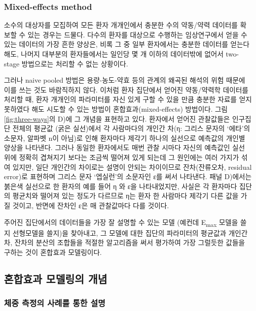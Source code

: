\documentclass[
  10pt,
  krantz2,
  a4paper]{krantz}
\theoremstyle{definition}
\theoremstyle{definition}
\theoremstyle{definition}
\theoremstyle{remark}
\begin{document}
\hypertarget{mixed-effects-method}{%
\subsubsection{Mixed-effects method}\label{mixed-effects-method}}

소수의 대상자를 모집하여 모든 환자 개개인에서 충분한 수의 약동/약력 데이터를 확보할 수 있는 경우는 드물다. 다수의 환자를 대상으로 수행하는 임상연구에서 얻을 수 있는 데이터의 가장 흔한 양상은, 비록 그 중 일부 환자에서는 충분한 데이터를 얻는다 해도, 나머지 대부분의 환자들에서는 일인당 몇 개 이하의 데이터밖에 없어서 two-stage 방법으로는 처리할 수 없는 상황이다.

그러나 naive pooled 방법은 용량-농도-약효 등의 관계의 왜곡된 해석의 위험 때문에 이를 쓰는 것도 바람직하지 않다. 이처럼 환자 집단에서 얻어진 약동/약력학 데이터를 처리할 때, 환자 개개인의 파라미터를 자신 있게 구할 수 있을 만큼 충분한 자료를 얻지 못하였다 해도 시도할 수 있는 방법이 혼합효과(mixed-effects) 방법이다. 그림 \ref{fig:three-ways}의 D)에 그 개념을 표현하고 있다. 환자에서 얻어진 관찰값들은 인구집단 전체의 평균값 (굵은 실선)에서 각 사람마다의 개인간 차(η: 그리스 문자의 `에타'의 소문자, 알파벳 n이 아님)로 인해 환자마다 제각기 하나의 실선으로 예측값의 개인별 양상을 나타낸다. 그러나 동일한 환자에서도 매번 관찰 시마다 자신의 예측값인 실선 위에 정확히 겹쳐지기 보다는 조금씩 떨어져 있게 되는데 그 원인에는 여러 가지가 섞여 있지만, 일단 개인간의 차이로는 설명이 안되는 차이이므로 잔차(잔류오차, residual error)로 표현하며 그리스 문자 `엡실런'의 소문자인 ε를 써서 나타낸다. 패널 D)에서는 붉은색 실선으로 한 환자의 예를 들어 η 와 ε을 나타내었지만, 사실은 각 환자마다 집단의 평균치와 떨어져 있는 정도가 다르므로 η는 환자 한 사람마다 제각기 다른 값을 가질 것이고, 반면에 잔차인 ε은 매 관찰값마다 다를 것이다.

주어진 집단에서의 데이터들을 가장 잘 설명할 수 있는 모델 (예컨데 E\textsubscript{max} 모델을 쓸지 선형모델을 쓸지)을 찾아내고, 그 모델에 대한 집단의 파라미터의 평균값과 개인간 차, 잔차의 분산의 조합들을 적절한 알고리즘을 써서 평가하여 가장 그럴듯한 값들을 구하는 것이 혼합효과 모델링이다.

\hypertarget{uxd63cuxd569uxd6a8uxacfc-uxbaa8uxb378uxb9c1uxc758-uxac1cuxb150}{%
\subsection{혼합효과 모델링의 개념}\label{uxd63cuxd569uxd6a8uxacfc-uxbaa8uxb378uxb9c1uxc758-uxac1cuxb150}}

\hypertarget{uxccb4uxc911-uxce21uxc815uxc758-uxc0acuxb840uxb97c-uxd1b5uxd55c-uxc124uxba85}{%
\subsubsection{체중 측정의 사례를 통한 설명}\label{uxccb4uxc911-uxce21uxc815uxc758-uxc0acuxb840uxb97c-uxd1b5uxd55c-uxc124uxba85}}
\end{document}
